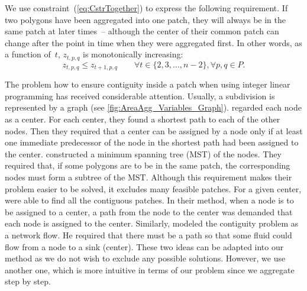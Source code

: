
We use constraint~(\ref{eq:CstrTogether}) 
to express the following requirement. 
If two polygons have been aggregated into one patch, 
they will always be in the same patch 
at later times~-- although the center of their common patch 
can change after the point in time 
when they were aggregated first. 
In other words, as a function of~$t$, 
$z_{t,p,q}$ is monotonically increasing:
\begin{equation}
\label{eq:CstrTogether}
z_{t,p,q} \le z_{t+1,p,q} \qquad
\forall t \in \{2,3,\ldots,n-2\},  
\forall p, q \in P.
\end{equation}

The problem how to ensure contiguity inside a patch 
when using integer linear programming 
has received considerable attention.
Usually, a subdivision is represented by a graph
(see \fig\ref{fig:AreaAgg_Variables_Graph}).
%
\textcite{Zoltners1983Territory} regarded each node as a center.
For each center, they found a shortest path 
to each of the other nodes.
Then they required that a center can be assigned 
by a node only if 
at least one immediate predecessor of the node 
in the shortest path had been assigned to the center.
%
\textcite{Williams2002Contiguous} constructed a minimum spanning 
tree (MST) of the nodes.
They required that,
if some polygons are to be in the same patch,
the corresponding nodes must 
form a subtree of the MST.
%
Although this requirement makes their problem easier to be solved,
it excludes many feasible patches.
For a given center, \textcite{Cova2000_Contiguity} 
were able to find all the contiguous patches.
In their method, when a node is to be assigned to a center, 
a path from the node to the center was demanded 
that each node is assigned to the center.
%
Similarly, \textcite{Shirabe2005Contiguity} modeled 
the contiguity problem as a network flow.
He required that there must be a path so that 
some fluid could flow from a node to a sink (center).
%
These two ideas can be adapted into our method
as we do not wish to exclude any possible solutions.
However, we use another one,
which is more intuitive in terms of our problem
since we aggregate step by step.


